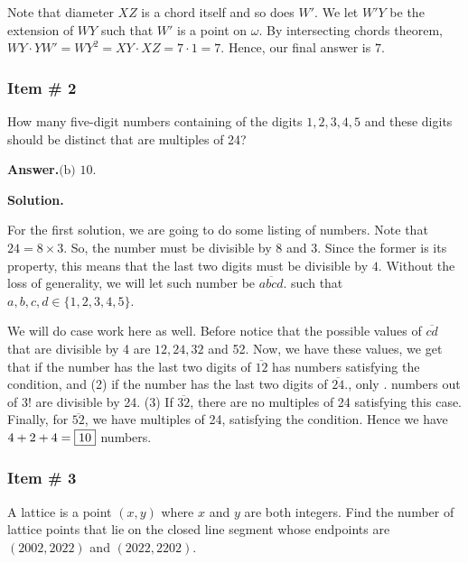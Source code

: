 \documentclass[11pt,paper=letter]{scrartcl}
\newcommand{\ans}[1]{{\sffamily \bfseries Answer.}\;\(\boxed{\text{#1}}\).}
\newcommand{\sol}{{\sffamily \bfseries Solution.}\;}
\begin{document}
Note that diameter $XZ$ is a chord itself and so does $W'$. We let $W'Y$ be the extension of $WY$ such that $W'$ is a point on $\omega$. By intersecting chords theorem, $WY \cdot YW' = WY^2 = XY \cdot XZ = 7 \cdot 1 = 7.$ Hence, our final answer is $7.$

\subsubsection{Item \# 2}

\begin{probboxed}
 How many five-digit numbers containing of the digits $1,2,3,4,5$ and these digits should be distinct that are multiples of 24?
    
\end{probboxed}

\ans{(b) 10}

\sol 

For the first solution, we are going to do some listing of numbers. Note that $24 = 8 \times 3$. So, the number must be divisible by $8$ and $3.$ Since the former is its property, this means that the last two digits must be divisible by $4.$ Without the loss of generality, we will let such number be $\overline{abcd}.$ such that $a,b,c,d \in \{1,2,3,4,5\}$. 


We will do case work here as well. Before notice that the possible values of $\overline{cd}$ that are divisible by 4 are $12, 24, 32$ and 52. Now, we have these values, we get that if the number has the last two digits of $\overline{12}$ has  numbers satisfying the condition, and (2) if the number has the last two digits of $\overline{24}.$, only . numbers out of 3! are divisible by 24. (3) If $\overline{32}$, there are no multiples of 24 satisfying this case. Finally, for $\overline{52}$, we have  multiples of 24, satisfying the condition. Hence we have $4+2+4 = \fbox{10}$ numbers.

\subsubsection{Item \# 3}

\begin{probboxed}
A lattice is a point $(x,y)$ where $x$ and $y$ are both integers. Find the number of lattice points that lie on the closed line segment whose endpoints are $(2002, 2022)$ and $(2022, 2202).$
    
\end{probboxed}
\end{document}
